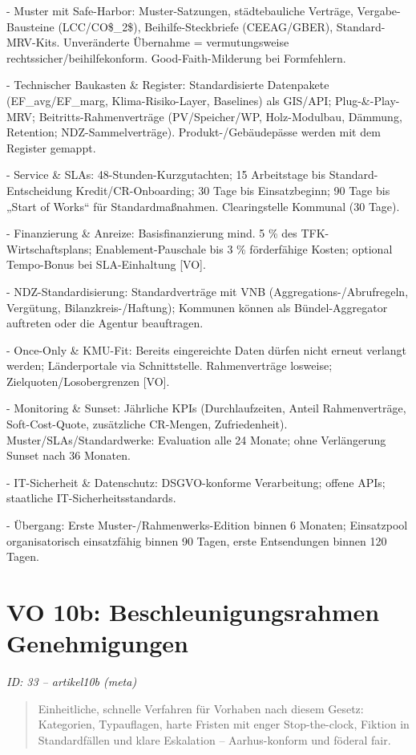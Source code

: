 \documentclass[12pt,a4paper]{scrartcl}
\begin{document}
- Muster mit Safe-Harbor: Muster-Satzungen, städtebauliche Verträge, Vergabe-Bausteine (LCC/CO\$\_2\$), Beihilfe-Steckbriefe (CEEAG/GBER), Standard-MRV-Kits. Unveränderte Übernahme = vermutungsweise rechtssicher/beihilfekonform. Good-Faith-Milderung bei Formfehlern.

- Technischer Baukasten \& Register: Standardisierte Datenpakete (EF\_avg/EF\_marg, Klima-Risiko-Layer, Baselines) als GIS/API; Plug-\&-Play-MRV; Beitritts-Rahmenverträge (PV/Speicher/WP, Holz-Modulbau, Dämmung, Retention; NDZ-Sammelverträge). Produkt-/Gebäudepässe werden mit dem Register gemappt.

- Service \& SLAs: 48-Stunden-Kurzgutachten; 15 Arbeitstage bis Standard-Entscheidung Kredit/CR-Onboarding; 30 Tage bis Einsatzbeginn; 90 Tage bis „Start of Works“ für Standardmaßnahmen. Clearingstelle Kommunal (30 Tage).

- Finanzierung \& Anreize: Basisfinanzierung mind. 5 \% des TFK-Wirtschaftsplans; Enablement-Pauschale bis 3 \% förderfähige Kosten; optional Tempo-Bonus bei SLA-Einhaltung [VO].

- NDZ-Standardisierung: Standardverträge mit VNB (Aggregations-/Abrufregeln, Vergütung, Bilanzkreis-/Haftung); Kommunen können als Bündel-Aggregator auftreten oder die Agentur beauftragen.

- Once-Only \& KMU-Fit: Bereits eingereichte Daten dürfen nicht erneut verlangt werden; Länderportale via Schnittstelle. Rahmenverträge losweise; Zielquoten/Losobergrenzen [VO].

- Monitoring \& Sunset: Jährliche KPIs (Durchlaufzeiten, Anteil Rahmenverträge, Soft-Cost-Quote, zusätzliche CR-Mengen, Zufriedenheit). Muster/SLAs/Standardwerke: Evaluation alle 24 Monate; ohne Verlängerung Sunset nach 36 Monaten.

- IT-Sicherheit \& Datenschutz: DSGVO-konforme Verarbeitung; offene APIs; staatliche IT-Sicherheitsstandards.

- Übergang: Erste Muster-/Rahmenwerks-Edition binnen 6 Monaten; Einsatzpool organisatorisch einsatzfähig binnen 90 Tagen, erste Entsendungen binnen 120 Tagen.


\section[VO 10b: Beschleunigungsrahmen Genehmigungen]{VO 10b: Beschleunigungsrahmen Genehmigungen}
\noindent\textit{ID: 33 -- artikel10b (meta)}

\begin{quote}
Einheitliche, schnelle Verfahren für Vorhaben nach diesem Gesetz: Kategorien, Typauflagen, harte Fristen mit enger Stop-the-clock, Fiktion in Standardfällen und klare Eskalation -- Aarhus-konform und föderal fair.
\end{quote}
\end{document}
